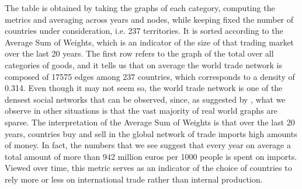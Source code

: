 The table is obtained by taking the graphs of each category, computing the metrics and averaging across years and nodes, while keeping fixed the number of countries under consideration, i.e. 237 territories.
It is sorted according to the Average Sum of Weights, which is an indicator of the size of that trading market over the last 20 years. The first row refers to the graph of the total over all categories of goods, and it tells us that on average the world trade network is composed of 17575 edges among 237 countries, which corresponds to a density of 0.314. Even though it may not seem so, the world trade network is one of the densest social networks that can be observed, since, as suggested by \textcite{barabasi2016network}, what we observe in other situations is that the vast majority of real world graphs are sparse. The interpretation of the Average Sum of Weights is that over the last 20 years, countries buy and sell in the global network of trade imports high amounts of money. In fact, the numbers that we see suggest that every year on average a total amount of more than 942 million euros per 1000 people is spent on imports. Viewed over time, this metric serves as an indicator of the choice of countries to rely more or less on international trade rather than internal production.
